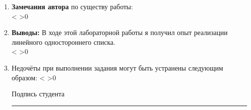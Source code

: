 \documentclass[a4paper]{article}
\makeatletter
\newcounter{i}
\newcommand{\PrintEmptyLines}[1]{\setcounter{i}{1}\@whilenum\value{i}<#1\do{\stepcounter{i}\EmptyLine\\} \ifnum #1>0 {\EmptyLine}\fi}
\newcommand\arulefill[1]{{\expandafter \ulined #1 \hfill}}
\newcommand{\EmptyLine}{\null\arulefill{}}
\newcommand{\mrule}[1]{\rule[-2.8pt]{#1}{.4pt}}
\newcounter{EmptyLines1}
\newcounter{EmptyLines2}
\newcounter{EmptyLines3}
\newcounter{EmptyLines10}
\newcounter{EmptyLines11}
\newcounter{EmptyLines12}
\newcommand{\Textx}{}  %
\newcommand{\Textxi}{
}  %
\makeatother
\begin{document}
\begin{enumerate}[label=\textbf{\arabic*}.]
\item \textbf{Замечания автора} {\footnotesize по существу работы:} \arulefill{\Textx} \\
\PrintEmptyLines{\value{EmptyLines2}}\\

\item \textbf{Выводы:} \arulefill{\footnotesize В ходе этой лабораторной работы я получил опыт реализации линейного одностороннего списка.} \Textxi \\
\PrintEmptyLines{\value{EmptyLines2}}\\


\item Недочёты при выполнении задания могут быть устранены следующим образом: {\footnotesize} \arulefill{\Textx}
\PrintEmptyLines{\value{EmptyLines2}}\\

 \begin{flushright}
Подпись студента \mrule{4cm}
\end{flushright}

\end{enumerate}
\end{document}
